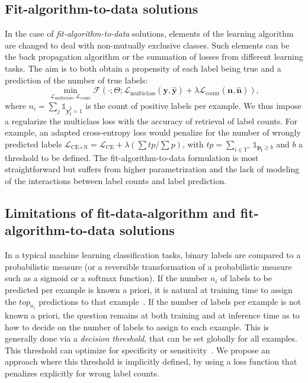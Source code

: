 \subsection{Fit-algorithm-to-data solutions}
\label{section:background:fitalgorithm}
In the case of \emph{fit-algorithm-to-data} solutions, elements of the learning algorithm are changed to deal with non-mutually exclusive classes. Such elements can be the back propagation algorithm or the summation of losses from different learning tasks.
The aim  is to both obtain a propensity of each label being true and a prediction of the number of true labels:
%
\begin{equation}
\underset{\mathcal{L}_{\text {multiclass}}, \mathcal{L}_{\text {count}}}
{\min} \mathcal{F}\left(\cdot ; \Theta; \mathcal{L}_{\text {multiclass}}
(\mathbf{y}, \hat{\mathbf{y}}) + \lambda \mathcal{L}_{\text {count}}
(\mathbf{n}, \hat{\mathbf{n}})\right),
\end{equation}
%
where \(n_i = \sum_j \mathds{1}_{\mathbf{y_i^j} = 1}\) is the count of
positive labels per example. We thus impose a regularize the multiclass loss with the accuracy of retrieval of label counts.
For example, an adapted cross-entropy loss would penalize for the number of wrongly predicted
labels \(\mathcal{L}_{\text {CE+N}}= \mathcal{L}_{\text {CE}} + \lambda (\sum
tp / \sum p)\), with \(t p=\sum_{i \in Y^{+}} \mathds{1}_{\mathbf{p_i} \geq
b}\) and \(b\) a threshold to be defined. The fit-algorithm-to-data
formulation is most straightforward but suffers from higher parametrization and
the lack of modeling of the interactions between label counts and label
prediction. 

\subsection{Limitations of fit-data-algorithm and fit-algorithm-to-data solutions}
\label{section:background:limitations}

In a typical machine learning classification tasks, binary labels are compared to a probabilistic measure (or a reversible
transformation of a probabilistic measure such as a sigmoid or a softmax
function). If the number $n_i$ of labels to be predicted per
example is known a priori, it is natural at training time to assign the $top_{n_i}$ predictions
to that example~\cite{lossTopKError, topKmulticlassSVM}. If the number of
labels per example is not known a priori, the question remains at both training and at inference time
as to how to decide on the number of labels to assign to each
example. This is generally done via a \emph{decision threshold}, that can be set globally for all
examples. This threshold can optimize for specificity or
sensitivity~\cite{decisionThreshold}. We propose an approach where this threshold
is implicitly defined, by using a loss function that penalizes explicitly for wrong label counts.

